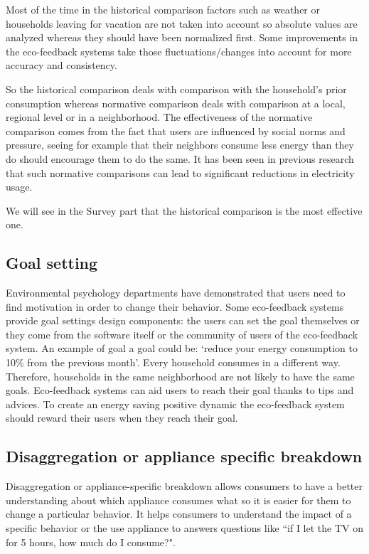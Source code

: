 \documentclass[journal]{vgtc}                %
\begin{document}
Most of the time in the historical comparison factors such as weather or households leaving for vacation are not taken into account so absolute values are analyzed whereas they should have been normalized first. Some improvements in the eco-feedback systems take those fluctuations/changes into account for more accuracy and consistency.

So the historical comparison deals with comparison with the household's prior consumption whereas normative comparison deals with comparison at a local, regional level or in a neighborhood. The effectiveness of the normative comparison comes from the fact that users are influenced by social norms and pressure, seeing for example that their neighbors consume less energy than they do should encourage them to do the same. It has been seen in previous research that such normative comparisons can lead to significant reductions in electricity usage\cite{peschiera2010response,siero1996changing,iyer2006comparison}.

We will see in the Survey part that the historical comparison is the most effective one.

\subsection{Goal setting}
Environmental psychology departments have demonstrated that users need to find motivation in order to change their behavior. Some eco-feedback systems provide goal settings design components: the users can set the goal themselves or they come from the software itself or the community of users of the eco-feedback system. An example of goal a goal could be: `reduce your energy consumption to 10\% from the previous month'.
Every household consumes in a different way. Therefore, households in the same neighborhood are not likely to have the same goals.
Eco-feedback systems can aid users to reach their goal thanks to tips and advices.
To create an energy saving positive dynamic the eco-feedback system should reward their users when they reach their goal. 

\subsection{Disaggregation or appliance specific breakdown}
Disaggregation or appliance-specific breakdown allows consumers to have a better understanding about which appliance consumes what so it is easier for them to change a particular behavior. It helps consumers to understand the impact of a specific behavior or the use appliance to answers questions like ``if I let the TV on for 5 hours, how much do I consume?".
\end{document}
